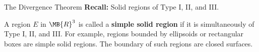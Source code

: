 \documentclass[11pt,english,
handout
]{beamer}
\begin{document}
\begin{frame}{The Divergence Theorem}
\small
\textbf{Recall:} Solid regions of Type I, II, and III.\pause

\lspace
%
%
%
%
%
%
%
%

\begin{definition}
A region $E$ in $\MB{R}^3$ is called a \textbf{simple solid region} if it is simultaneously of Type I, II, and III. For example, regions bounded by ellipsoids or rectangular boxes are simple solid regions. The boundary of such regions are closed surfaces.
\end{definition}
\end{frame}
\end{document}
